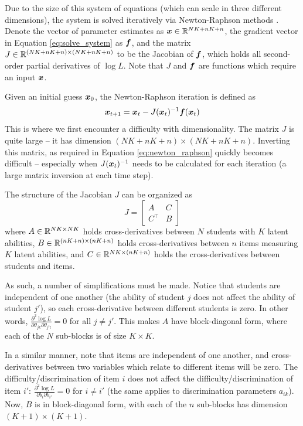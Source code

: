 Due to the size of this system of equations (which can scale in three different dimensions), the system is solved iteratively via Newton-Raphson methods \cite{ben_israel1966}. Denote the vector of parameter estimates as $\boldsymbol{x} \in \mathbb{R}^{NK+nK+n}$, the gradient vector in Equation \ref{eq:solve_system} as $\boldsymbol{f}$, and the matrix $J\in \mathbb{R}^{(NK + nK +n) \times(NK + nK + n)}$ to be the Jacobian of $\boldsymbol{f}$, which holds all second-order partial derivatives of $\log L$. Note that $J$ and $\boldsymbol{f}$ are functions which require an input $\boldsymbol{x}$.

Given an initial guess $\boldsymbol{x}_0$, the Newton-Raphson iteration is defined as
\begin{equation}
  \boldsymbol{x}_{t+1} = \boldsymbol{x}_t - J(\boldsymbol{x}_t)^{-1} \boldsymbol{f}(\boldsymbol{x}_t)
  \label{eq:newton_raphson}
\end{equation}
This is where we first encounter a difficulty with dimensionality. The matrix $J$ is quite large -- it has dimension $(NK+nK+n) \times (NK+nK+n)$. Inverting this matrix, as required in Equation \ref{eq:newton_raphson} quickly becomes difficult -- especially when $J(\boldsymbol{x}_t)^{-1}$ needs to be calculated for each iteration (a large matrix inversion at each time step).

The structure of the Jacobian $J$ can be organized as
\begin{equation}
  J = \begin{bmatrix}
    A & C \\
    C^\top & B
  \end{bmatrix}
  \label{eq:jacobian_blocks}
\end{equation}
where $A \in \mathbb{R}^{NK \times NK}$ holds cross-derivatives between $N$ students with $K$ latent abilities, $B \in \mathbb{R}^{(nK+n) \times (nK+n)}$ holds cross-derivatives between $n$ items measuring $K$ latent abilities, and $C \in \mathbb{R}^{NK \times (nK+n)}$ holds the cross-derivatives between students and items.

As such, a number of simplifications must be made. Notice that students are independent of one another (the ability of student $j$ does not affect the ability of student $j'$), so each cross-derivative between different students is zero. In other words, $\frac{\partial^2 \log L}{\partial\theta_{j k} \partial \theta_{j' l}} = 0$ for all $j \not= j'$. This makes $A$ have block-diagonal form, where each of the $N$ sub-blocks is of size $K\times K$. 

In a similar manner, note that items are independent of one another, and cross-derivatives between two variables which relate to different items will be zero. The difficulty/discrimination of item $i$ does not affect the difficulty/discrimination of item $i'$: $\frac{\partial^2 \log L}{\partial b_{i} \partial b_{i'}} = 0$ for $i \not = i'$ (the same applies to discrimination parameters $a_{ik}$). Now, $B$ is in block-diagonal form, with each of the $n$ sub-blocks has dimension $(K+1) \times (K+1)$. 

